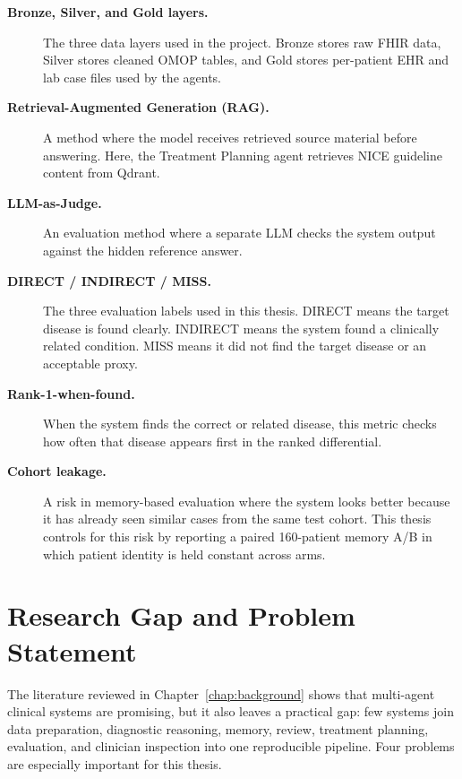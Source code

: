 \begin{description}
  \item[\textbf{Bronze, Silver, and Gold layers.}] The three data layers used in
    the project. Bronze stores raw FHIR data, Silver stores cleaned OMOP tables,
    and Gold stores per-patient EHR and lab case files used by the agents.

  \item[\textbf{Retrieval-Augmented Generation (RAG).}] A method where the model
    receives retrieved source material before answering. Here, the Treatment
    Planning agent retrieves NICE guideline content from Qdrant.

  \item[\textbf{LLM-as-Judge.}] An evaluation method where a separate LLM checks
    the system output against the hidden reference answer.

  \item[\textbf{DIRECT / INDIRECT / MISS.}] The three evaluation labels used in
    this thesis. DIRECT means the target disease is found clearly. INDIRECT means
    the system found a clinically related condition. MISS means it did not find
    the target disease or an acceptable proxy.

  \item[\textbf{Rank-1-when-found.}] When the system finds the correct or related
    disease, this metric checks how often that disease appears first in the
    ranked differential.

  \item[\textbf{Cohort leakage.}] A risk in memory-based evaluation where the
    system looks better because it has already seen similar cases from the same
    test cohort. This thesis controls for this risk by reporting a paired
    160-patient memory A/B in which patient identity is held constant across
    arms.

\end{description}

\section{Research Gap and Problem Statement}
\label{sec:problem}

The literature reviewed in Chapter~\ref{chap:background} shows that
multi-agent clinical systems are promising, but it also leaves a practical gap:
few systems join data preparation, diagnostic reasoning, memory, review,
treatment planning, evaluation, and clinician inspection into one reproducible
pipeline. Four problems are especially important for this thesis.


